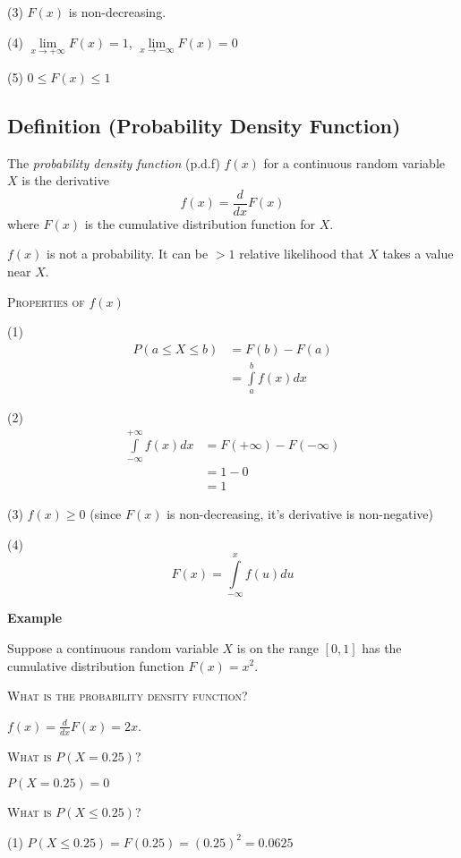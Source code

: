 (3) $ F(x) $ is non-decreasing.

(4) $ \lim\limits_{{x} \to {+\infty}} F(x)=1 $,
$ \lim\limits_{{x} \to {-\infty}} F(x)=0 $

(5) $ 0\le F(x)\le 1 $

\begin{defbox}
    \subsection{Definition (Probability Density Function)}
    The \emph{probability density function} (p.d.f) $ f(x) $ for a continuous
    random variable $ X $ is the derivative
    \[ f(x)=\frac{d}{dx}F(x) \]
    where $ F(x) $ is the cumulative distribution function for $ X $.
\end{defbox}

\begin{remark}
    $ f(x) $ is not a probability. It can be $ >1 $ relative
    likelihood that $ X $ takes a value near $ X $.
\end{remark}

\textsc{Properties of $ f(x) $}

(1)
\begin{align*}
    P(a\le X\le b)&=F(b)-F(a)\\
    &=\int\limits_{a}^{b} f(x) d{x}
\end{align*}

(2)
\begin{align*}
    \int\limits_{-\infty}^{+\infty} f(x) d{x}&=F(+\infty)-F(-\infty)\\
    &=1-0\\
    &=1
\end{align*}

(3) $ f(x)\ge 0 $ (since $ F(x) $ is non-decreasing, it's derivative is non-negative)

(4) \[ F(x)=\int\limits_{-\infty}^{x} f(u) d{u} \]

\textbf{Example}

Suppose a continuous random variable $ X $ is on the range $ [0,1] $ has the 
cumulative distribution function $ F(x)=x^2 $.

\textsc{What is the probability density function?}

$ f(x)=\frac{d}{dx} F(x)=2x $.

\textsc{What is $ P(X=0.25) $?}

$ P(X=0.25)=0 $

\textsc{What is $ P(X\le 0.25) $?}

(1) $ P(X\le 0.25)=F(0.25)=(0.25)^2=0.0625 $

